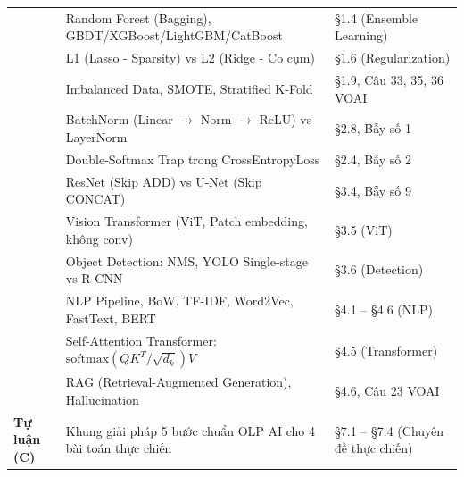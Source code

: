 \documentclass[10pt,a4paper]{article}
\begin{document}
\begin{center}
\begin{tabularx}{\textwidth}{l p{7cm} X}
& Random Forest (Bagging), GBDT/XGBoost/LightGBM/CatBoost & \S1.4 (Ensemble Learning) \\
& L1 (Lasso - Sparsity) vs L2 (Ridge - Co cụm) & \S1.6 (Regularization) \\
& Imbalanced Data, SMOTE, Stratified K-Fold & \S1.9, Câu 33, 35, 36 VOAI \\
& BatchNorm (Linear $\to$ Norm $\to$ ReLU) vs LayerNorm & \S2.8, Bẫy số 1 \\
& Double-Softmax Trap trong CrossEntropyLoss & \S2.4, Bẫy số 2 \\
& ResNet (Skip ADD) vs U-Net (Skip CONCAT) & \S3.4, Bẫy số 9 \\
& Vision Transformer (ViT, Patch embedding, không conv) & \S3.5 (ViT) \\
& Object Detection: NMS, YOLO Single-stage vs R-CNN & \S3.6 (Detection) \\
& NLP Pipeline, BoW, TF-IDF, Word2Vec, FastText, BERT & \S4.1 -- \S4.6 (NLP) \\
& Self-Attention Transformer: $\text{softmax}(QK^T/\sqrt{d_k})V$ & \S4.5 (Transformer) \\
& RAG (Retrieval-Augmented Generation), Hallucination & \S4.6, Câu 23 VOAI \\
\midrule
\textbf{Tự luận (C)} & Khung giải pháp 5 bước chuẩn OLP AI cho 4 bài toán thực chiến & \S7.1 -- \S7.4 (Chuyên đề thực chiến) \\
\bottomrule
\end{tabularx}
\end{center}
\end{document}
